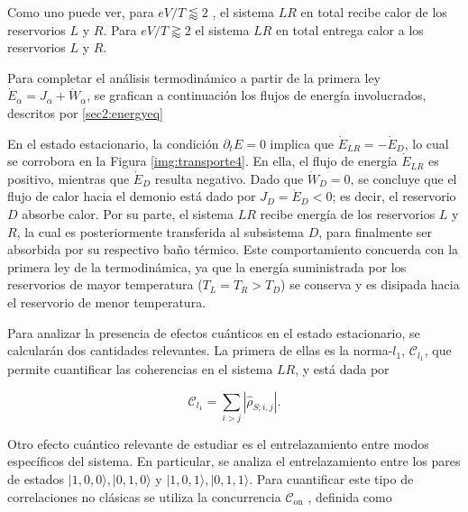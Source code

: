     
Como uno puede ver, para $eV/T \lessapprox 2$ , el sistema $LR$ en total recibe calor de los reservorios $L$ y $R$. Para $eV/T \gtrapprox 2$ el sistema $LR$ en total entrega calor a los reservorios $L$ y $R$. 

Para completar el análisis termodinámico a partir de la primera ley $\dot{E}_{\alpha} = J_{\alpha} + \dot{W}_{\alpha}$, se grafican a continuación los flujos de energía involucrados, descritos por \ref{sec2:energyeq}


En el estado estacionario, la condición \( \partial_t E = 0 \) implica que \( \dot{E}_{LR} = -\dot{E}_D \), lo cual se corrobora en la Figura \ref{img:transporte4}. En ella, el flujo de energía \( \dot{E}_{LR} \) es positivo, mientras que \( \dot{E}_D \) resulta negativo. Dado que \( \dot{W}_{D} = 0 \), se concluye que el flujo de calor hacia el demonio está dado por \( J_D = \dot{E}_D < 0 \); es decir, el reservorio \( D \) absorbe calor. Por su parte, el sistema \( LR \) recibe energía de los reservorios \( L \) y \( R \), la cual es posteriormente transferida al subsistema \( D \), para finalmente ser absorbida por su respectivo baño térmico. Este comportamiento concuerda con la primera ley de la termodinámica, ya que la energía suministrada por los reservorios de mayor temperatura (\( T_L = T_R > T_D \)) se conserva y es disipada hacia el reservorio de menor temperatura.

Para analizar la presencia de efectos cuánticos en el estado estacionario, se calcularán dos cantidades relevantes. La primera de ellas es la norma-\( l_{1} \), \( \mathcal{C}_{l_{1}} \), que permite cuantificar las coherencias en el sistema \( LR \), y está dada por


\begin{equation*}
    \mathcal{C}_{l_{1}} = \sum_{i> j} |\hat{\rho}_{S;i,j}|.
\end{equation*}

Otro efecto cuántico relevante de estudiar es el entrelazamiento entre modos específicos del sistema. En particular, se analiza el entrelazamiento entre los pares de estados \(|1,0,0\rangle, |0,1,0\rangle\) y \(|1,0,1\rangle, |0,1,1\rangle\). Para cuantificar este tipo de correlaciones no clásicas se utiliza la concurrencia \( \mathcal{C}_{\text{on}} \) \cite{hill1997entanglement, wootters1998entanglement}, definida como

